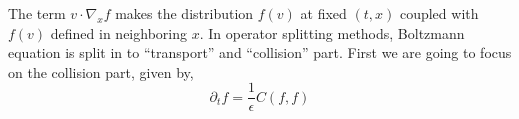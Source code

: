 The term $v\cdot \nabla_x f$ makes the distribution $f(v)$ at fixed $(t,x)$ coupled with $f(v)$ defined in neighboring $x$. In operator splitting methods, Boltzmann equation is split in to ``transport'' and ``collision'' part. First we are going to focus on the collision part, given by, 
\begin{equation}
    \partial_t f = \frac{1}{\epsilon}C(f,f) \label{eq:col_op}
\end{equation}




